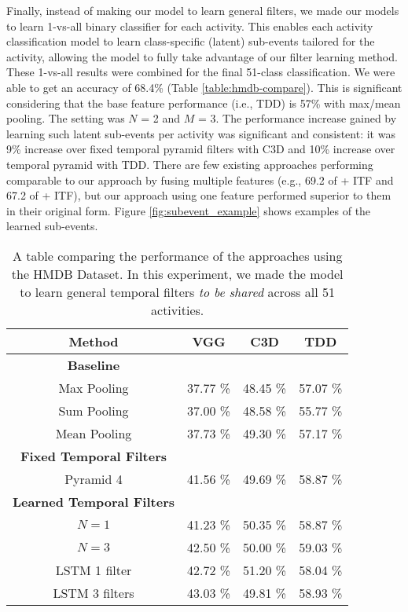 \documentclass[letterpaper]{article}
\begin{document}
Finally, instead of making our model to learn general filters, we made our models to learn 1-vs-all binary classifier for each activity. This enables each activity classification model to learn class-specific (latent) sub-events tailored for the activity, allowing the model to fully take advantage of our filter learning method. These 1-vs-all results were combined for the final 51-class classification. We were able to get an accuracy of 68.4\% (Table \ref{table:hmdb-compare}). This is significant considering that the base feature performance (i.e., TDD) is 57\% with max/mean pooling. The setting was $N$ = 2 and $M$ = 3. The performance increase gained by learning such latent sub-events per activity was significant and consistent: it was 9\% increase over fixed temporal pyramid filters with C3D and 10\% increase over temporal pyramid with TDD. There are few existing approaches performing comparable to our approach by fusing multiple features (e.g., 69.2 of 
\cite{feichtenhofer2016} + ITF and 67.2 of \cite{varol16} + ITF), but our approach using one feature performed superior to them in their original form. Figure \ref{fig:subevent_example} shows examples of the learned sub-events.






\begin{table}[]
\small
\caption{A table comparing the performance of the approaches using the HMDB Dataset. In this experiment, we made the model to learn general temporal filters \emph{to be shared} across all 51 activities.}
\label{table:hmdb_results}

\center
\setlength\extrarowheight{0pt}
\begin{tabular}{c|c|c|c}\hline
Method       &  VGG & C3D & TDD \\\hline
\textbf{Baseline}       \\\hline
Max Pooling  &  37.77 \% &  48.45 \%  &  57.07 \%  \\
Sum Pooling  &  37.00 \% &  48.58 \%  &  55.77 \%   \\
Mean Pooling &  37.73 \% &  49.30 \%  &  57.17 \%  \\\hline
\textbf{Fixed Temporal Filters}       \\\hline
Pyramid 4  &  41.56 \%   & 49.69 \%  &  58.87 \%\\\hline
\textbf{Learned Temporal Filters}       \\\hline
$N=1$           &  41.23 \%  & 50.35 \%  &  58.87 \% \\
$N=3$           &  42.50 \%  & 50.00 \%  &  59.03 \%  \\
LSTM 1 filter   &  42.72 \%  & 51.20 \%  &  58.04 \%  \\
LSTM 3 filters  &  43.03 \%  & 49.81 \%  &  58.93 \%  \\\hline
\end{tabular}
\end{table}
\end{document}
